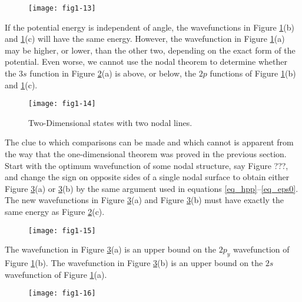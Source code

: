 \begin{figure}
\texttt{[image: fig1-13]}
\caption{}
\label{fig1-13}
\end{figure}
    
If the potential energy is independent of angle, the wavefunctions in
Figure \ref{fig1-13}(b) and \ref{fig1-13}(c) will have the same
energy. However, the wavefunction in Figure \ref{fig1-13}(a) may be
higher, or lower, than the other two, depending on the exact form of
the potential. Even worse, we cannot use the nodal theorem to
determine whether the 3$s$ function in Figure \ref{fig1-14}(a) is above, or below,
the $2p$ functions of Figure \ref{fig1-13}(b) and \ref{fig1-13}(c).

\begin{figure}
\texttt{[image: fig1-14]}
\caption{Two-Dimensional states with two nodal lines.}
\label{fig1-14}
\end{figure}

The clue to which comparisons can be made and which cannot is
apparent from the way that the one-dimensional theorem was proved in
the previous section.  Start with the optimum wavefunction of some
nodal structure, say Figure ???, and change the sign on opposite sides
of a single nodal surface to obtain either Figure \ref{fig1-15}(a) or
\ref{fig1-15}(b) by the same argument used in equations
\ref{eq_hpp}--\ref{eq_eps0}. The new wavefunctions in Figure
\ref{fig1-15}(a) and Figure \ref{fig1-15}(b) must have exactly the
same energy as Figure \ref{fig1-14}(c).

\begin{figure}
\begin{center}
\texttt{[image: fig1-15]}
\end{center}
\caption{}
\label{fig1-15}
\end{figure}

The wavefunction in Figure \ref{fig1-15}(a) is an upper bound on the
$2p_y$ wavefunction of Figure \ref{fig1-13}(b). The wavefunction in
Figure \ref{fig1-15}(b) is an upper bound on the $2s$ wavefunction of
Figure \ref{fig1-13}(a).

\begin{figure}
\begin{center}
\begin{center}
\texttt{[image: fig1-16]}
\end{center}
\end{center}
\caption{}
\label{fig1-16}
\end{figure}

